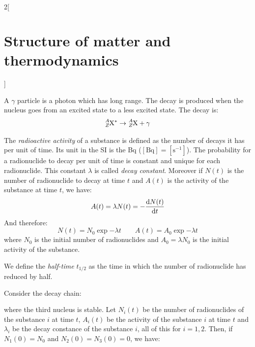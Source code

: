 \documentclass[../../../main_physics.tex]{subfiles}
\begin{document}
\begin{multicols}{2}[\section{Structure of matter and thermodynamics}]
\begin{definition}
\begin{enumerate}
    \end{enumerate}
  \end{definition}
  \begin{definition}
    A $\gamma$ particle is a photon which has long range. The decay is produced when the nucleus goes from an excited state to a less excited state. The decay is: $$\ce{^$A$_$Z$X}^*\rightarrow\ce{^$A$_$Z$X}+\gamma$$
  \end{definition}
  \begin{definition}
    The \emph{radioactive activity} of a substance is defined as the number of decays it has per unit of time. Its unit in the SI is the Bq ($[\text{Bq}]=[\text{s}^{-1}]$). The probability for a radionuclide to decay per unit of time is constant and unique for each radionuclide. This constant $\lambda$ is called \emph{decay constant}. Moreover if $N(t)$ is the number of radionuclide to decay at time $t$ and $A(t)$ is the activity of the substance at time $t$, we have:
    $$A(t)=\lambda N(t)=-\dv{N(t)}{t}$$ And therefore:
    $$N(t)=N_0\exp{-\lambda t}\qquad A(t)=A_0\exp{-\lambda t}$$
    where $N_0$ is the initial number of radionuclides and $A_0=\lambda N_0$ is the initial activity of the substance.
  \end{definition}
  \begin{definition}
    We define the \emph{half-time} $t_{1/2}$ as the time in which the number of radionuclide has reduced by half.
  \end{definition}
  \begin{center}
    \begin{minipage}{\linewidth}
      \centering
      
    \end{minipage}
  \end{center}
  \begin{proposition}
    Consider the decay chain:
    \begin{center}
      \begin{minipage}{\linewidth}
        \centering
        
      \end{minipage}
    \end{center}
    where the third nucleus is stable.
    Let $N_i(t)$ be the number of radionuclides of the substance $i$ at time $t$, $A_i(t)$ be the activity of the substance $i$ at time $t$ and $\lambda_i$ be the decay constance of the substance $i$, all of this for $i=1,2$. Then, if $N_1(0)=N_0$ and $N_2(0)=N_3(0)=0$, we have:

\end{proposition}
\end{multicols}
\end{document}
